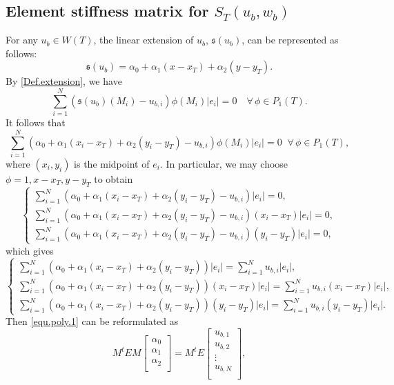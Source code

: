 \documentclass[final,leqno]{siamltex704}
\def\S{{\mathfrak s}}
\begin{document}
\subsection{Element stiffness matrix for $S_T(u_b,w_b)$}
For any $u_b\in W(T)$, the linear extension of $u_b$, $\S(u_b)$, can be represented as follows:
\[
\S(u_b)=\alpha_0 + \alpha_1 (x-x_T) + \alpha_2 (y-y_T).
\]
By \eqref{Def.extension}, we have
\[
\sum_{i=1}^{N}(\S(u_b)(M_i) -u_{b,i})\phi(M_i)|e_i|=0\quad \forall\, \phi\in {P}_1(T).
\]
It follows that
\[
\sum_{i=1}^{N}\left(\alpha_0 + \alpha_1 (x_{i}-x_T) + \alpha_2 (y_{i}-y_T) -  u_{b,i}\right)\phi(M_i)|e_i|=0\;\; \forall\, \phi\in {P}_1(T),
\]
where $(x_i, y_i)$ is the midpoint of $e_i$.
In particular, we may choose $\phi=1, x-x_T, y-y_T$ to obtain
\begin{equation*}
\left\{
\begin{array}{lll}
\displaystyle\sum_{i=1}^{N}\left( \alpha_0 + \alpha_1 (x_{i}-x_T) + \alpha_2 (y_{i}-y_T) -u_{b,i}\right)|e_i|=0,\\
\displaystyle\sum_{i=1}^{N}\left( \alpha_0 + \alpha_1 (x_{i}-x_T) + \alpha_2 (y_{i}-y_T) -u_{b,i}\right) (x_{i}-x_T)|e_i|=0,\\
\displaystyle\sum_{i=1}^{N}\left( \alpha_0 + \alpha_1 (x_{i}-x_T) + \alpha_2 (y_{i}-y_T) -u_{b,i}\right) (y_{i}-y_T)|e_i|=0,
\end{array}
\right.
\end{equation*}
which gives
\begin{equation}\label{equ.poly.1}
\left\{
\begin{array}{lll}
\displaystyle\sum_{i=1}^{N}\left( \alpha_0 + \alpha_1 (x_{i}-x_T) + \alpha_2 (y_{i}-y_T)\right)|e_i| = \sum_{i=1}^{N}u_{b,i}|e_i|,\\
\displaystyle\sum_{i=1}^{N}\left( \alpha_0 + \alpha_1 (x_{i}-x_T) + \alpha_2 (y_{i}-y_T)\right) (x_{i}-x_T)|e_i| = \sum_{i=1}^{N}u_{b,i}(x_{i}-x_T)|e_i|,\\
\displaystyle\sum_{i=1}^{N}\left( \alpha_0 + \alpha_1 (x_{i}-x_T) + \alpha_2 (y_{i}-y_T)\right) (y_{i}-y_T)|e_i| = \sum_{i=1}^{N}u_{b,i}(y_{i}-y_T)|e_i|.
\end{array}
\right.
\end{equation}
Then \eqref{equ.poly.1} can be reformulated as
\begin{equation*}
M^tEM
\begin{bmatrix}
\alpha_0  \\
\alpha_1  \\
\alpha_2  \\
\end{bmatrix}
=M^tE
\begin{bmatrix}
u_{b,1} \\
u_{b,2} \\
\vdots  \\
u_{b,N} \\
\end{bmatrix},
\end{equation*}
\end{document}

